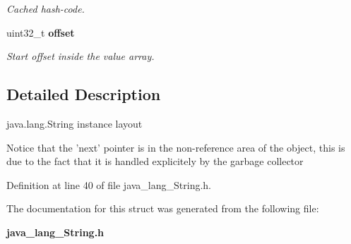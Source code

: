 \begin{DoxyCompactItemize}
\begin{DoxyCompactList}\small\item\em Cached hash-\/code. \item\end{DoxyCompactList}\item 
uint32\_\-t {\bf offset}\label{structjava__lang___string__t_a8a18d8f01ca600ce18c290b875e4d612}

\begin{DoxyCompactList}\small\item\em Start offset inside the value array. \item\end{DoxyCompactList}\end{DoxyCompactItemize}


\subsection{Detailed Description}
java.lang.String instance layout

Notice that the 'next' pointer is in the non-\/reference area of the object, this is due to the fact that it is handled explicitely by the garbage collector 

Definition at line 40 of file java\_\-lang\_\-String.h.



The documentation for this struct was generated from the following file:\begin{DoxyCompactItemize}
\item 
{\bf java\_\-lang\_\-String.h}\end{DoxyCompactItemize}
